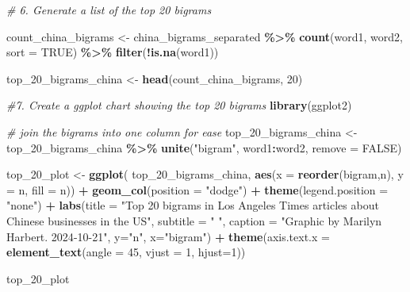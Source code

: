 \documentclass[
]{article}
\newenvironment{Shaded}{\begin{snugshade}}{\end{snugshade}}
\newcommand{\AttributeTok}[1]{\textcolor[rgb]{0.13,0.29,0.53}{#1}}
\newcommand{\CommentTok}[1]{\textcolor[rgb]{0.56,0.35,0.01}{\textit{#1}}}
\newcommand{\ConstantTok}[1]{\textcolor[rgb]{0.56,0.35,0.01}{#1}}
\newcommand{\DecValTok}[1]{\textcolor[rgb]{0.00,0.00,0.81}{#1}}
\newcommand{\FunctionTok}[1]{\textcolor[rgb]{0.13,0.29,0.53}{\textbf{#1}}}
\newcommand{\NormalTok}[1]{#1}
\newcommand{\OtherTok}[1]{\textcolor[rgb]{0.56,0.35,0.01}{#1}}
\newcommand{\SpecialCharTok}[1]{\textcolor[rgb]{0.81,0.36,0.00}{\textbf{#1}}}
\newcommand{\StringTok}[1]{\textcolor[rgb]{0.31,0.60,0.02}{#1}}
\begin{document}
\begin{Shaded}
\begin{Highlighting}[]
\CommentTok{\# 6. Generate a list of the top 20 bigrams}

\NormalTok{count\_china\_bigrams }\OtherTok{\textless{}{-}}\NormalTok{ china\_bigrams\_separated }\SpecialCharTok{\%\textgreater{}\%}
  \FunctionTok{count}\NormalTok{(word1, word2, }\AttributeTok{sort =} \ConstantTok{TRUE}\NormalTok{) }\SpecialCharTok{\%\textgreater{}\%} 
  \FunctionTok{filter}\NormalTok{(}\SpecialCharTok{!}\FunctionTok{is.na}\NormalTok{(word1))}

\NormalTok{top\_20\_bigrams\_china }\OtherTok{\textless{}{-}} \FunctionTok{head}\NormalTok{(count\_china\_bigrams, }\DecValTok{20}\NormalTok{)}
\end{Highlighting}
\end{Shaded}

\begin{Shaded}
\begin{Highlighting}[]
\CommentTok{\#7. Create a ggplot chart showing the top 20 bigrams}
\FunctionTok{library}\NormalTok{(ggplot2)}

\CommentTok{\# join the bigrams into one column for ease}
\NormalTok{top\_20\_bigrams\_china }\OtherTok{\textless{}{-}}\NormalTok{ top\_20\_bigrams\_china }\SpecialCharTok{\%\textgreater{}\%}
  \FunctionTok{unite}\NormalTok{(}\StringTok{"bigram"}\NormalTok{, word1}\SpecialCharTok{:}\NormalTok{word2, }\AttributeTok{remove =} \ConstantTok{FALSE}\NormalTok{)}

\NormalTok{top\_20\_plot }\OtherTok{\textless{}{-}} \FunctionTok{ggplot}\NormalTok{(}
\NormalTok{  top\_20\_bigrams\_china,}
  \FunctionTok{aes}\NormalTok{(}\AttributeTok{x =} \FunctionTok{reorder}\NormalTok{(bigram,n), }\AttributeTok{y =}\NormalTok{ n, }\AttributeTok{fill =}\NormalTok{ n)) }\SpecialCharTok{+}
  \FunctionTok{geom\_col}\NormalTok{(}\AttributeTok{position =} \StringTok{"dodge"}\NormalTok{) }\SpecialCharTok{+} 
  \FunctionTok{theme}\NormalTok{(}\AttributeTok{legend.position =} \StringTok{"none"}\NormalTok{) }\SpecialCharTok{+}
  \FunctionTok{labs}\NormalTok{(}\AttributeTok{title =} \StringTok{"Top 20 bigrams in Los Angeles Times articles about Chinese businesses in the US"}\NormalTok{,}
       \AttributeTok{subtitle =} \StringTok{" "}\NormalTok{,}
       \AttributeTok{caption =} \StringTok{"Graphic by Marilyn Harbert. 2024{-}10{-}21"}\NormalTok{,}
       \AttributeTok{y=}\StringTok{"n"}\NormalTok{,}
       \AttributeTok{x=}\StringTok{"bigram"}\NormalTok{) }\SpecialCharTok{+} 
  \FunctionTok{theme}\NormalTok{(}\AttributeTok{axis.text.x =} \FunctionTok{element\_text}\NormalTok{(}\AttributeTok{angle =} \DecValTok{45}\NormalTok{, }\AttributeTok{vjust =} \DecValTok{1}\NormalTok{, }\AttributeTok{hjust=}\DecValTok{1}\NormalTok{))}

\NormalTok{top\_20\_plot}
\end{Highlighting}
\end{Shaded}
\end{document}
